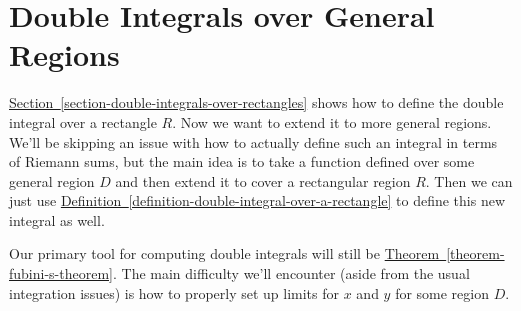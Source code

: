 \documentclass[10pt,]{book}
\theoremstyle{ptxplainnotitle}
\theoremstyle{ptxplaintitle}
\theoremstyle{ptxplainnotitle}
\theoremstyle{ptxplaintitle}
\theoremstyle{ptxplainnotitle}
\theoremstyle{ptxplaintitle}
\theoremstyle{ptxdefinitionnotitle}
\theoremstyle{ptxdefinitiontitle}
\theoremstyle{ptxdefinitionnotitle}
\theoremstyle{ptxdefinitiontitle}
\theoremstyle{ptxdefinitionnotitle}
\theoremstyle{ptxdefinitiontitle}
\theoremstyle{ptxdefinitionnotitle}
\theoremstyle{ptxdefinitiontitle}
\theoremstyle{ptxdefinitionnotitle}
\theoremstyle{ptxdefinitiontitle}
\numberwithin{equation}{section}
\begin{document}
\section[{Double Integrals over General Regions}]{Double Integrals over General Regions}\label{section-double-integrals-over-general-regions}
\bigbreak
\hypertarget{p-1127}{}%
\hyperref[section-double-integrals-over-rectangles]{Section~\ref{section-double-integrals-over-rectangles}} shows how to define the double integral over a rectangle \(R\). Now we want to extend it to more general regions. We'll be skipping an issue with how to actually define such an integral in terms of Riemann sums, but the main idea is to take a function defined over some general region \(D\) and then extend it to cover a rectangular region \(R\). Then we can just use \hyperref[definition-double-integral-over-a-rectangle]{Definition~\ref{definition-double-integral-over-a-rectangle}} to define this new integral as well.%
\par
\hypertarget{p-1128}{}%
Our primary tool for computing double integrals will still be \hyperref[theorem-fubini-s-theorem]{Theorem~\ref{theorem-fubini-s-theorem}}. The main difficulty we'll encounter (aside from the usual integration issues) is how to properly set up limits for \(x\) and \(y\) for some region \(D\).%
\end{document}
